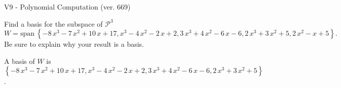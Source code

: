 \begin{exercise}
  \begin{exerciseTitle}V9 - Polynomial Computation (ver. 669)\end{exerciseTitle}
  \begin{exerciseStatement}
    Find a basis for the subspace of \(\mathcal{P}^3\) 
\[W=\mathrm{span}\ \left\{-8 \, x^{3} - 7 \, x^{2} + 10 \, x + 17 , x^{3} - 4 \, x^{2} - 2 \, x + 2 , 3 \, x^{3} + 4 \, x^{2} - 6 \, x - 6 , 2 \, x^{3} + 3 \, x^{2} + 5 , 2 \, x^{2} - x + 5\right\}.\]
 Be sure to explain why your result is a basis.


  \end{exerciseStatement}
  \begin{exerciseAnswer}
   A basis of \(W\) is  \(\left\{-8 \, x^{3} - 7 \, x^{2} + 10 \, x + 17 , x^{3} - 4 \, x^{2} - 2 \, x + 2 , 3 \, x^{3} + 4 \, x^{2} - 6 \, x - 6 , 2 \, x^{3} + 3 \, x^{2} + 5\right\}\).
  


  \end{exerciseAnswer}
\end{exercise}
